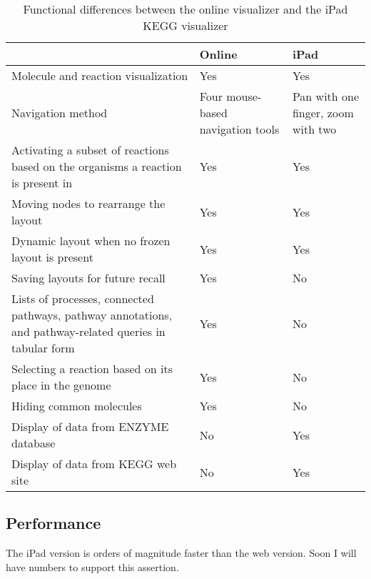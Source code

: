\begin{table}[ht!]
\centering
\begin{tabular}{ | p{2.75in} | p{1.25in} | p{1.25in} | }
    \hline
                        & Online    & iPad \\ \hline

    Molecule and reaction visualization
                        & Yes       & Yes \\ \hline

    Navigation method   & Four mouse-based navigation tools
                                    & Pan with one finger, zoom with two
                                    \\ \hline

    Activating a subset of reactions based on the organisms a reaction is
    present in
                        & Yes       & Yes \\ \hline

    Moving nodes to rearrange the layout
                        & Yes       & Yes \\ \hline

    Dynamic layout when no frozen layout is present
                        & Yes       & Yes \\ \hline

    Saving layouts for future recall
                        & Yes       & No \\ \hline

    Lists of processes, connected pathways, pathway annotations, and
    pathway-related queries in tabular form
                        & Yes       & No \\ \hline

    Selecting a reaction based on its place in the genome
                        & Yes       & No \\ \hline

    Hiding common molecules
                        & Yes       & No \\ \hline

    Display of data from ENZYME database
                        & No        & Yes \\ \hline

    Display of data from KEGG web site
                        & No        & Yes \\ \hline
\end{tabular}
    \caption{Functional differences between the online \pathcasekegg visualizer
    and the iPad KEGG visualizer}
    \label{fig:kegg_comparison_table}
\end{table}

\subsection{Performance}
\label{sect:kegg_comparison_performance}

The iPad version is orders of magnitude faster than the web version. Soon I will
have numbers to support this assertion.
